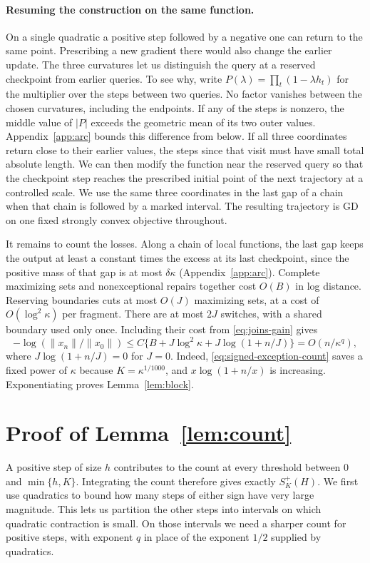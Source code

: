 \documentclass[11pt]{article}
\theoremstyle{definition}
\begin{document}
\paragraph{Resuming the construction on the same function.}
On a single quadratic a positive step followed by a negative one can
return to the same point. Prescribing a new gradient there would also
change the earlier update. The three curvatures let us distinguish the
query at a reserved checkpoint from earlier queries. To see why, write
\(P(\lambda)=\prod_t(1-\lambda h_t)\) for the multiplier over the steps
between two queries. No factor vanishes between the chosen curvatures,
including the endpoints. If any of the steps is nonzero, the middle value
of \(|P|\) exceeds the geometric mean of its two outer values.
Appendix~\ref{app:arc} bounds this difference from below. If all three
coordinates return close to their earlier values, the steps since that
visit must have small total absolute length. We can then modify the
function near the reserved query so that the checkpoint step reaches the prescribed initial
point of the next trajectory at a controlled scale. We use the same three
coordinates in the last gap of a chain when that chain is followed by a
marked interval. The resulting trajectory is GD on one fixed strongly
convex objective throughout.

It remains to count the losses. Along a chain of local functions, the last
gap keeps the output at least a constant times the excess at its last
checkpoint, since the positive mass of that gap is at most \(\delta\kappa\)
(Appendix~\ref{app:arc}). Complete maximizing sets and nonexceptional
repairs together cost \(O(B)\) in log distance. Reserving boundaries cuts
at most \(O(J)\) maximizing sets, at a cost of \(O(\log^2\kappa)\) per
fragment. There are at most \(2J\) switches, with a shared boundary used
only once. Including their cost from \eqref{eq:joins-gain} gives
\[
 -\log(\|x_n\|/\|x_0\|)
 \le C\{B+J\log^2\kappa+J\log(1+n/J)\}=O(n/\kappa^q),
\]
where \(J\log(1+n/J)=0\) for \(J=0\). Indeed,
\eqref{eq:signed-exception-count} saves a fixed power of \(\kappa\)
because \(K=\kappa^{1/1000}\), and \(x\log(1+n/x)\) is increasing.
Exponentiating proves Lemma~\ref{lem:block}.
\section{Proof of Lemma~\ref{lem:count}}\label{sec:proof-count}

A positive step of size \(h\) contributes to the count at every threshold
between \(0\) and \(\min\{h,K\}\). Integrating the count therefore gives
exactly \(S_K^+(H)\). We first use quadratics to bound how many steps of
either sign have very large magnitude. This lets us partition the other
steps into intervals on which quadratic contraction is small. On those
intervals we need a sharper count for positive steps, with exponent \(q\)
in place of the exponent \(1/2\) supplied by quadratics.
\end{document}
